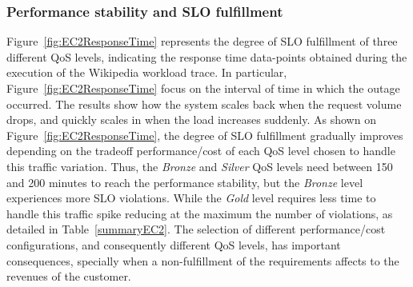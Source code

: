 \subsubsection{Performance stability and SLO fulfillment} 
Figure~\ref{fig:EC2ResponseTime} represents the degree of SLO fulfillment of three different QoS levels, indicating the response time data-points obtained during the execution of the Wikipedia workload trace. In particular, Figure~\ref{fig:EC2ResponseTime} focus on the interval of time in which the outage occurred. The results show how the system scales back when the request volume drops, and quickly scales in when the load increases suddenly. As shown on Figure~\ref{fig:EC2ResponseTime},  the degree of SLO fulfillment gradually improves depending on the tradeoff performance/cost of each QoS level chosen to handle this traffic variation. Thus, the \emph{Bronze} and \emph{Silver} QoS levels need between 150 and 200 minutes to reach the performance stability,  but the \emph{Bronze} level experiences more SLO violations. While the \emph{Gold} level requires less time to handle this traffic spike reducing at the maximum the number of violations, as detailed in Table~\ref{summaryEC2}. The selection of different performance/cost configurations, and consequently different QoS levels, has important consequences, specially when a non-fulfillment of the requirements affects to the revenues of the customer.

\setcounter{figure}{6}

